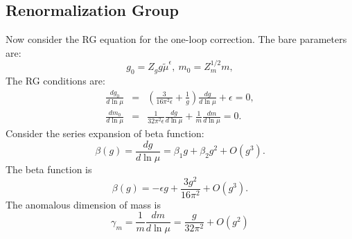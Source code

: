 \subsection{Renormalization Group}
Now consider the RG equation for the one-loop correction. 
The bare parameters are:
\begin{equation}
	g_0 = Z_g g\tilde{\mu}^{\epsilon},\ 
	m_0 = Z_m^{1/2} m,
\end{equation}
The RG conditions are:
\begin{eqnarray}
	\frac{d g_0}{d\ln \mu}
	&=& \left(\frac{3}{16\pi^2 \epsilon} + \frac{1}{g}\right)\frac{dg}{d\ln \mu} + \epsilon = 0, \\
	\frac{d m_0}{d\ln \mu}
	&=& \frac{1}{32\pi^2 \epsilon}\frac{dg}{d\ln \mu} + \frac{1}{m}\frac{dm}{d \ln \mu} = 0.
\end{eqnarray}
Consider the series expansion of beta function:
\begin{equation}
	\beta(g) = \frac{dg}{d\ln \mu} = \beta_1 g + \beta_2 g^2 +O(g^3).
\end{equation}
The beta function is
\begin{equation}
	\beta(g) = -\epsilon g + \frac{3g^2}{16\pi^2} + O(g^3).
\end{equation}
The anomalous dimension of mass is
\begin{equation}
	\gamma_m = \frac{1}{m}\frac{dm}{d \ln \mu} = \frac{g}{32\pi^2}+O(g^2)
\end{equation}




